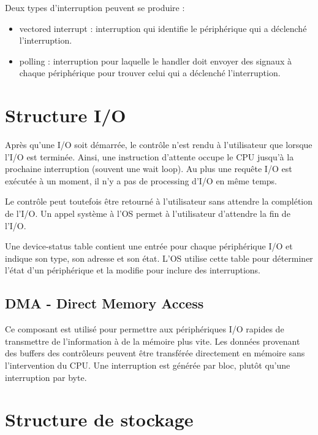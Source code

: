 	
	Deux types d'interruption peuvent se produire :
	
	\begin{itemize}
		\item vectored interrupt : interruption qui identifie le périphérique qui a déclenché l'interruption.
		\item polling : interruption pour laquelle le handler doit envoyer des signaux à chaque périphérique pour trouver celui qui a déclenché l'interruption.
	\end{itemize}
	
	\section{Structure I/O}
	
	Après qu'une I/O soit démarrée, le contrôle n'est rendu à l'utilisateur que lorsque l'I/O est terminée. Ainsi, une instruction d'attente occupe le CPU jusqu'à la prochaine interruption (souvent une wait loop). Au plus une requête I/O est exécutée à un moment, il n'y a pas de processing d'I/O en même temps.
	
	Le contrôle peut toutefois être retourné à l'utilisateur sans attendre la complétion de l'I/O. Un appel système à l'OS permet à l'utilisateur d'attendre la fin de l'I/O.
	
	Une device-status table contient une entrée pour chaque périphérique I/O et indique son type, son adresse et son état. L'OS utilise cette table pour déterminer l'état d'un périphérique et la modifie pour inclure des interruptions.
	
		\subsection{DMA - Direct Memory Access}
		
		Ce composant est utilisé pour permettre aux périphériques I/O rapides de transmettre de l'information à de la mémoire plus vite. Les données provenant des buffers des contrôleurs peuvent être transférée directement en mémoire sans l'intervention du CPU. Une interruption est générée par bloc, plutôt qu'une interruption par byte.
		
	\section{Structure de stockage}
	
